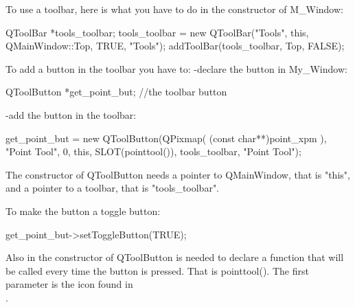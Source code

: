 To use a toolbar, here is what you have to do in the constructor of M\_Window:
\begin{ccExampleCode}
QToolBar  *tools_toolbar;
tools_toolbar = new QToolBar("Tools", this, QMainWindow::Top, TRUE, "Tools");
addToolBar(tools_toolbar, Top, FALSE);
\end{ccExampleCode}
To add a button in the toolbar you have to:
-declare the button in My\_Window:
\begin{ccExampleCode}
QToolButton *get_point_but;     //the toolbar button
\end{ccExampleCode}
-add the button in the toolbar:
\begin{ccExampleCode}
get_point_but =  new QToolButton(QPixmap( (const char**)point_xpm ),
                                         "Point Tool", 
                                         0, 
                                         this, 
                                         SLOT(pointtool()), 
                                         tools_toolbar, 
                                         "Point Tool");
\end{ccExampleCode}
The constructor of QToolButton needs a pointer to QMainWindow, that is
"this", and a pointer to a toolbar, that is "tools\_toolbar".

To make the button a toggle button:
\begin{ccExampleCode}
get_point_but->setToggleButton(TRUE);
\end{ccExampleCode}
Also in the constructor of QToolButton is needed to declare a function
that will be called every time the button is pressed. That is
pointtool(). The first parameter is the icon found in\\
 .







